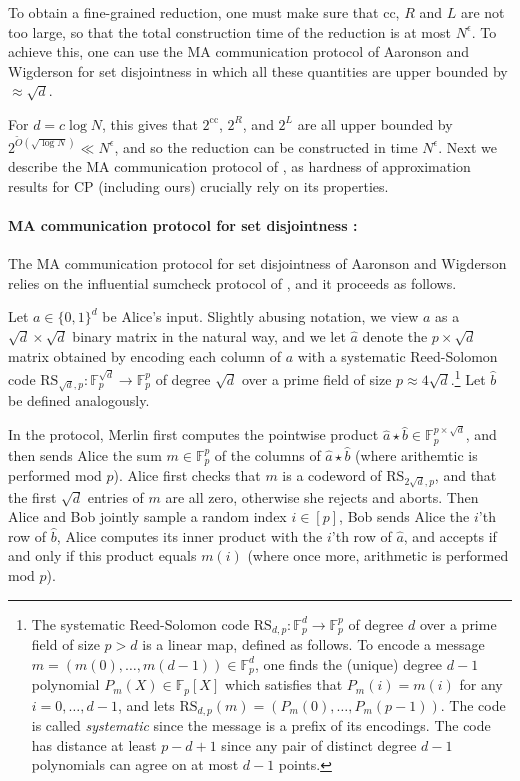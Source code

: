 \documentclass[11pt]{article}
\theoremstyle{plain}
\theoremstyle{remark}
\newcommand{\F}{\mathbb{F}}
\newcommand{\cc}{\mathrm{cc}}
\begin{document}
To obtain a fine-grained reduction, one must make sure that $\cc$, $R$ and $L$ are not too large,
so that the total construction time of the reduction is at most $N^{\epsilon}$. To achieve this, one can use the MA communication protocol of Aaronson and Wigderson \cite{AW09} for set disjointness in which all these quantities are upper bounded by $\approx \sqrt{d}$. 

For $d = c \log N$, this gives that $2^\cc$, $2^R$, and $2^L$ are all upper bounded by $2^{\tilde O(\sqrt{ \log N})} \ll N^{\epsilon}$, and so the reduction can be constructed in time  $N^{\epsilon}$. 
Next we describe the MA communication protocol of \cite{AW09}, as hardness of approximation results for CP (including ours) crucially rely on its properties.

\paragraph{MA communication protocol for set disjointness \cite{AW09}:} The MA communication protocol for set disjointness of Aaronson and Wigderson \cite{AW09} relies on the influential sumcheck protocol of \cite{LFKN92}, and it proceeds as follows.

Let $a \in\{0,1\}^{d}$ be Alice's input. 
Slightly abusing notation, we view $a$ as a $\sqrt{d} \times \sqrt{d}$ binary matrix in the natural way, and we let $\hat a$ denote the $p \times \sqrt{d}$ matrix obtained by encoding each column of $a$ with a systematic Reed-Solomon code $\mathrm{RS}_{\sqrt{d}, p} : \F_p^{\sqrt{d}} \to \F_p^{p}$ of degree $\sqrt{d}$ over a prime field of size $p \approx 4\sqrt{d}$.\footnote{The systematic Reed-Solomon code $\mathrm{RS}_{d,p}: \F_p^d \to \F_p^p$ of degree $d$ over a prime field of size $p>d$ is a linear map, defined as follows. To encode a message $m = (m(0),\ldots, m(d-1))  \in \F_p^d$, one finds the (unique) degree $d-1$ polynomial $P_m(X) \in \F_p[X]$ which satisfies that $P_m(i) = m(i)$ for any $i = 0, \ldots , d-1$, and lets $\mathrm{RS}_{d,p}(m)= (P_m(0), \ldots, P_m(p-1))$. The code is called \emph{systematic} since the message is a prefix of its encodings.
The code has distance at least $p-d+1$ since any pair of distinct degree $d-1$ polynomials can agree on at most $d-1$ points. }
 Let $\hat b$ be defined analogously.

In the protocol, Merlin first computes the pointwise product $\hat a \star \hat b \in \F_p^{p\times \sqrt{d}}$, and then sends Alice the sum $m \in \F_p^p$ of the columns of $\hat a \star \hat b$ (where arithemtic is performed mod $p$). Alice first checks that $m$ is a codeword of $\mathrm{RS}_{2\sqrt{d},p}$, and that the first $\sqrt{d}$ entries of $m$ are all zero, otherwise she rejects and aborts.
Then Alice and Bob jointly sample a random index $i \in [p]$, Bob sends Alice the $i$'th row of $\hat b$, Alice computes its inner product with the $i$'th row of $\hat a$, and accepts if and only if this product equals $m(i)$ (where once more, arithmetic is performed mod $p$).
 
\end{document}
